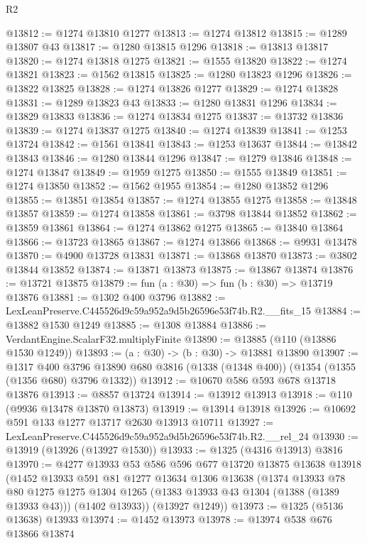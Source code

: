 \begin{lexlean}{R2}
\begin{coremodule}
@13812 := @1274 @13810 @1277
@13813 := @1274 @13812
@13815 := @1289 @13807 @43
@13817 := @1280 @13815 @1296
@13818 := @13813 @13817
@13820 := @1274 @13818 @1275
@13821 := @1555 @13820
@13822 := @1274 @13821
@13823 := @1562 @13815
@13825 := @1280 @13823 @1296
@13826 := @13822 @13825
@13828 := @1274 @13826 @1277
@13829 := @1274 @13828
@13831 := @1289 @13823 @43
@13833 := @1280 @13831 @1296
@13834 := @13829 @13833
@13836 := @1274 @13834 @1275
@13837 := @13732 @13836
@13839 := @1274 @13837 @1275
@13840 := @1274 @13839
@13841 := @1253 @13724
@13842 := @1561 @13841
@13843 := @1253 @13637
@13844 := @13842 @13843
@13846 := @1280 @13844 @1296
@13847 := @1279 @13846
@13848 := @1274 @13847
@13849 := @1959 @1275
@13850 := @1555 @13849
@13851 := @1274 @13850
@13852 := @1562 @1955
@13854 := @1280 @13852 @1296
@13855 := @13851 @13854
@13857 := @1274 @13855 @1275
@13858 := @13848 @13857
@13859 := @1274 @13858
@13861 := @3798 @13844 @13852
@13862 := @13859 @13861
@13864 := @1274 @13862 @1275
@13865 := @13840 @13864
@13866 := @13723 @13865
@13867 := @1274 @13866
@13868 := @9931 @13478
@13870 := @4900 @13728 @13831
@13871 := @13868 @13870
@13873 := @3802 @13844 @13852
@13874 := @13871 @13873
@13875 := @13867 @13874
@13876 := @13721 @13875
@13879 := fun (a : @30) => fun (b : @30) => @13719 @13876
@13881 := @1302 @400 @3796
@13882 := LexLeanPreserve.C445526d9c59a952a9d5b26596e53f74b.R2.__fits_15
@13884 := @13882 @1530 @1249
@13885 := @1308 @13884
@13886 := VerdantEngine.ScalarF32.multiplyFinite
@13890 := @13885 (@110 (@13886 @1530 @1249))
@13893 := (a : @30) -> (b : @30) -> @13881 @13890
@13907 := @1317
    @400
    @3796
    @13890
    @680
    @3816
    (@1338 (@1348 @400))
    (@1354 (@1355 (@1356 @680) @3796 @1332))
@13912 := @10670 @586 @593 @678 @13718 @13876
@13913 := @8857 @13724
@13914 := @13912 @13913
@13918 := @110 (@9936 @13478 @13870 @13873)
@13919 := @13914 @13918
@13926 := @10692 @591 @133 @1277 @13717 @2630 @13913 @10711
@13927 := LexLeanPreserve.C445526d9c59a952a9d5b26596e53f74b.R2.__rel_24
@13930 := @13919 (@13926 (@13927 @1530))
@13933 := @1325 (@4316 @13913) @3816
@13970 := @4277
    @13933
    @53
    @586
    @596
    @677
    @13720
    @13875
    @13638
    @13918
    (@1452
      @13933
      @591
      @81
      @1277
      @13634
      @1306
      @13638
      (@1374
        @13933
        @78
        @80
        @1275
        @1275
        @1304
        @1265
        (@1383 @13933 @43 @1304 (@1388 (@1389 @13933 @43)))
        (@1402 @13933))
      (@13927 @1249))
@13973 := @1325 (@5136 @13638) @13933
@13974 := @1452 @13973
@13978 := @13974 @538 @676 @13866 @13874

\end{coremodule}
\end{lexlean}
